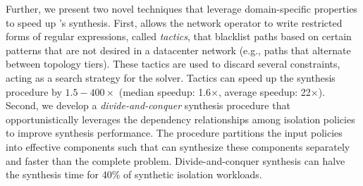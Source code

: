 
Further, we present two novel techniques that leverage domain-specific properties to speed up \Name's synthesis.
First, \Name
allows the network operator to write restricted forms of regular
expressions, called \emph{tactics}, that blacklist paths based on
certain patterns that are not desired in a datacenter network (e.g.,
paths that alternate between topology tiers).
These tactics are used to discard several constraints, 
acting as a search strategy for the solver.
Tactics can speed up the synthesis procedure by
$1.5-400\times$ (median speedup: 1.6$\times$, average speedup:
22$\times$).
 Second, we develop a \emph{divide-and-conquer} synthesis procedure
 that opportunistically leverages the dependency relationships among
 isolation policies to improve synthesis performance. The procedure
 partitions the input policies into effective components such that
 \name can synthesize these components separately and faster than the
 complete problem.  Divide-and-conquer synthesis can halve the
 synthesis time for 40\% of synthetic isolation workloads.


